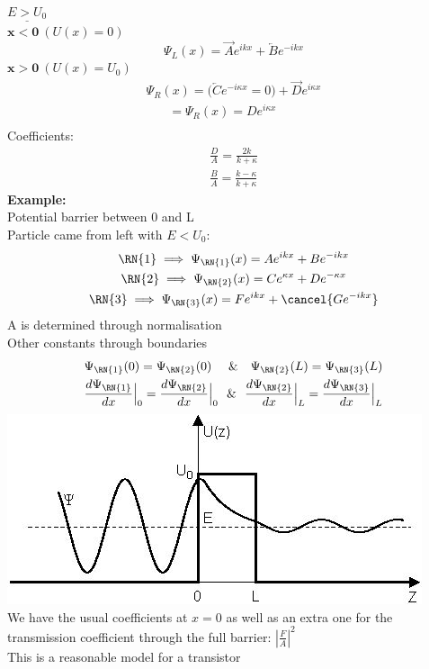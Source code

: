 \documentclass[a4paper, 11pt, fleqn, normalem]{report}
\begin{document}
$\underline{E > U_{0}}$ \\
$\mathbf{x < 0}~(U(x) = 0)$
\begin{equation*}
    \Psi_{L}(x) = \overrightarrow{A}e^{ikx} + \overleftarrow{B}e^{-ikx}
\end{equation*}
$\mathbf{x > 0}~(U(x) = U_{0})$
\begin{gather*}
    \Psi_{R}(x) = \big(\overleftarrow{C}e^{-i\kappa x} = 0\big) + \overrightarrow{D}e^{i\kappa x} \\
    ~~~~~~~~ = \Psi_{R}(x) = De^{i\kappa x} \\
\end{gather*}
Coefficients:
\begin{gather*}
    \frac{D}{A} = \frac{2k}{k + \kappa} \\
    \frac{B}{A} = \frac{k - \kappa}{k + \kappa}
\end{gather*}
\textbf{Example:} \\
Potential barrier between 0 and L \\
Particle came from left with $E < U_{0}$:
\begin{gather*}
    \RN{1} \implies \Psi_{\RN{1}}(x) = Ae^{ikx} + Be^{-ikx} \\
    \RN{2} \implies \Psi_{\RN{2}}(x) = Ce^{\kappa x} + De^{-\kappa x} \\
    \RN{3} \implies \Psi_{\RN{3}}(x) = Fe^{ikx} + \cancel{Ge^{-ikx}}
\end{gather*}
A is determined through normalisation \\
Other constants through boundaries
\begin{gather*}
    \Psi_{\RN{1}}(0) = \Psi_{\RN{2}}(0)~~~~\&~~~\Psi_{\RN{2}}(L) = \Psi_{\RN{3}}(L) \\
    \frac{d\Psi_{\RN{1}}}{dx}\Big|_{0} = \frac{d\Psi_{\RN{2}}}{dx}\Big|_{0}~~\&~~\frac{d\Psi_{\RN{2}}}{dx}\Big|_{L} = \frac{d\Psi_{\RN{3}}}{dx}\Big|_{L}
\end{gather*}
\includegraphics{PotBar.jpg} \\
We have the usual coefficients at $x = 0$ as well as an extra one for the transmission coefficient through the full barrier: $|\frac{F}{A}|^{2}$ \\
This is a reasonable model for a transistor
\end{document}
